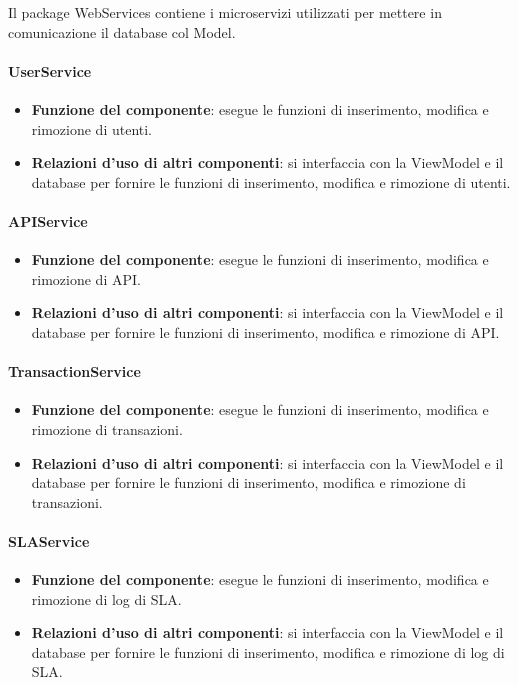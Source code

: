 Il package WebServices contiene i microservizi utilizzati per mettere in comunicazione il database col Model.

\paragraph{UserService}
\begin{itemize}
	\item \textbf{Funzione del componente}: esegue le funzioni di inserimento, modifica e rimozione di utenti.
	\item \textbf{Relazioni d’uso di altri componenti}: si interfaccia con la ViewModel e il database per fornire le funzioni di inserimento, modifica e rimozione di utenti.
\end{itemize}

\paragraph{APIService}
\begin{itemize}
	\item \textbf{Funzione del componente}: esegue le funzioni di inserimento, modifica e rimozione di API.
\item \textbf{Relazioni d’uso di altri componenti}: si interfaccia con la ViewModel e il database per fornire le funzioni di inserimento, modifica e rimozione di API.
\end{itemize}

\paragraph{TransactionService}
\begin{itemize}
	\item \textbf{Funzione del componente}: esegue le funzioni di inserimento, modifica e rimozione di transazioni.
\item \textbf{Relazioni d’uso di altri componenti}: si interfaccia con la ViewModel e il database per fornire le funzioni di inserimento, modifica e rimozione di transazioni.
\end{itemize}


\paragraph{SLAService}
\begin{itemize}
	\item \textbf{Funzione del componente}: esegue le funzioni di inserimento, modifica e rimozione di log di SLA.
\item \textbf{Relazioni d’uso di altri componenti}: si interfaccia con la ViewModel e il database per fornire le funzioni di inserimento, modifica e rimozione di log di SLA.
\end{itemize}

